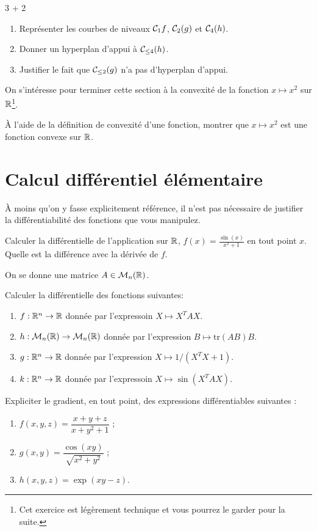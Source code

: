 \documentclass[11pt, a4paper]{article}
\begin{document}
\begin{question}{3 + 2}
  \begin{enumerate}
  \item Représenter les courbes de niveaux $\mathcal{C}_1{f}$,
    $\mathcal{C}_2(g)$ et $\mathcal{C}_{4}(h)$.
  \item Donner un hyperplan d'appui à $\mathcal{C}_{\leq 4}(h)$.
  \item Justifier le fait que $\mathcal{C}_{\leq 2}(g)$ n'a pas d'hyperplan
    d'appui.
  \end{enumerate}
\end{question}
On s'intéresse pour terminer cette section à la convexité de la
fonction $x \mapsto x^2$ sur $\mathbb{R}$\footnote{Cet exercice est légèrement
  technique et vous pourrez le garder pour la suite.}.
\begin{question}{3}
  À l'aide de la définition de convexité d'une fonction, montrer que
  $x \mapsto x^2$ est une fonction convexe sur $\mathbb{R}$.
\end{question}


\section{Calcul différentiel élémentaire}

À moins qu'on y fasse explicitement référence, il n'est pas nécessaire
de justifier la différentiabilité des fonctions que vous
manipulez.
\begin{question}{1}
  Calculer la différentielle de l'application sur $\mathbb{R}$,
  $f(x) = \frac{\sin(x)}{x^2+1}$ en tout point $x$. Quelle est la
  différence avec la dérivée de $f$.
\end{question}
On se donne une matrice $A \in \mathcal{M}_n(\mathbb{R})$.
\begin{question}{5}
  Calculer la différentielle des fonctions suivantes:
  \begin{enumerate}
  \item $f :\mathbb{R}^n \rightarrow \mathbb{R}$ donnée par l'expressoin
    $X \mapsto X^TAX$.
  \item $h : \mathcal{M}_n(\mathbb{R}) \rightarrow \mathcal{M}_n(\mathbb{R})$ donnée par
    l'expression $B \mapsto \mathrm{tr}(AB)B$.
  \item $g : \mathbb{R}^n \rightarrow \mathbb{R}$ donnée par l'expression
    $X \mapsto 1/(X^TX + 1)$.
  \item $k :\mathbb{R}^n \rightarrow \mathbb{R}$ donnée par l'expressoin
    $X \mapsto \sin(X^TAX)$.
  \end{enumerate}
\end{question}
\begin{question}{3}
  Expliciter le gradient, en tout point, des expressions
  différentiables suivantes :
  \begin{enumerate}
  \item $f(x, y, z) = \dfrac{x + y + z}{x+y^2+1}$ ;
  \item $g(x, y) = \dfrac{\cos(xy)}{\sqrt{x^2 + y^2}}$ ;
  \item $h(x, y, z) = \exp(xy - z)$.
  \end{enumerate}
\end{question}
\end{document}

